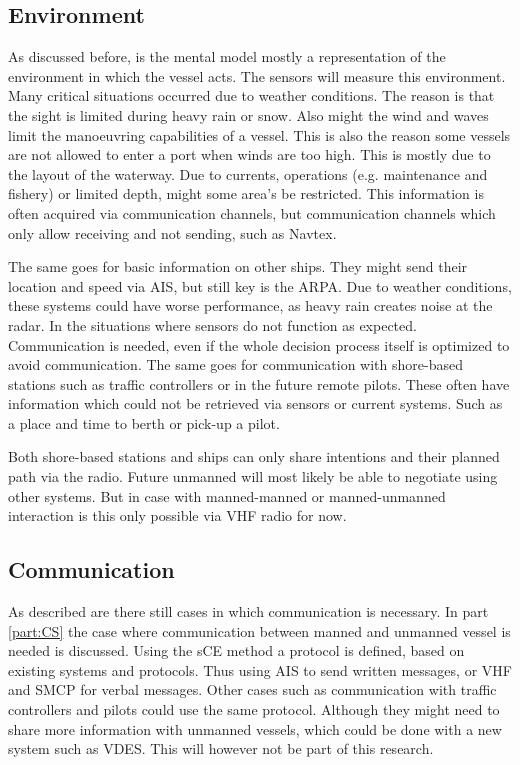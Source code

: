 \subsection{Environment}
As discussed before, is the mental model mostly a representation of the environment in which the vessel acts. The sensors will measure this environment. Many critical situations occurred due to weather conditions. The reason is that the sight is limited during heavy rain or snow. Also might the wind and waves limit the manoeuvring capabilities of a vessel. This is also the reason some vessels are not allowed to enter a port when winds are too high.
This is mostly due to the layout of the waterway. Due to currents, operations (e.g. maintenance and fishery) or limited depth, might some area's be restricted. This information is often acquired via communication channels, but communication channels which only allow receiving and not sending, such as \acf{Navtex}.

The same goes for basic information on other ships. They might send their location and speed via \ac{AIS}, but still key is the \ac{ARPA}. Due to weather conditions, these systems could have worse performance, as heavy rain creates noise at the radar. In the situations where sensors do not function as expected. Communication is needed, even if the whole decision process itself is optimized to avoid communication.
The same goes for communication with shore-based stations such as traffic controllers or in the future remote pilots. These often have information which could not be retrieved via sensors or current systems. Such as a place and time to berth or pick-up a pilot.

Both shore-based stations and ships can only share intentions and their planned path via the radio. Future unmanned will most likely be able to negotiate using other systems. But in case with manned-manned or manned-unmanned interaction is this only possible via \ac{VHF} radio for now.

\subsection{Communication}
As described are there still cases in which communication is necessary. In part \ref{part:CS} the case where communication between manned and unmanned vessel is needed is discussed. Using the \acf{sCE} method a protocol is defined, based on existing systems and protocols. Thus using \ac{AIS} to send written messages, or \ac{VHF} and \ac{SMCP} for verbal messages. 
Other cases such as communication with traffic controllers and pilots could use the same protocol. Although they might need to share more information with unmanned vessels, which could be done with a new system such as \ac{VDES}. This will however not be part of this research.
